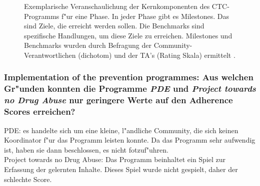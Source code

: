 \begin{figure}[hb!]
        \begin{center}
        \end{center}
        \caption{Exemplarische Veranschaulichung der Kernkomponenten des CTC-Programms f"ur eine Phase. In jeder Phase gibt es Milestones. Das sind Ziele, die erreicht werden sollen. Die Benchmarks sind spezifische Handlungen, um diese Ziele zu erreichen. Milestones und Benchmarks wurden durch Befragung der Community-Verantwortlichen (dichotom) und der TA's (Rating Skala) ermittelt \parencite{fagan_translational_2009}.}
        \label{fig:fagan1}
\end{figure}

\subsubsection{Implementation of the prevention programmes: Aus welchen Gr"unden konnten die Programme \emph{PDE} und \emph{Project towards no Drug Abuse} nur geringere Werte auf den Adherence Scores erreichen?}
PDE: es handelte sich um eine kleine, l"andliche Community, die sich keinen Koordinator f"ur das Programm leisten konnte. Da das Programm sehr aufwendig ist, haben sie dann beschlossen, es nicht fotzuf"uhren.\\
Project towards no Drug Abuse: Das Programm beinhaltet ein Spiel zur Erfassung der gelernten Inhalte. Dieses Spiel wurde nicht gespielt, daher der schlechte Score.

